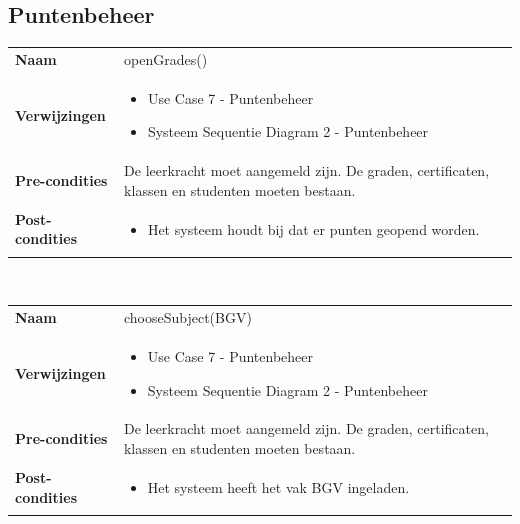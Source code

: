 \documentclass[a4paper]{article}
\begin{document}
\subsection{Puntenbeheer}
\begin{tabularx}{\textwidth}{|l X|}
    \hline
    \textbf{Naam} & openGrades() \\
    \textbf{Verwijzingen} & \begin{itemize}[leftmargin=*]
        \item Use Case 7 - Puntenbeheer
        \item Systeem Sequentie Diagram 2 - Puntenbeheer
    \end{itemize}\\
    \textbf{Pre-condities} & De leerkracht moet aangemeld zijn. De graden, certificaten, klassen en studenten moeten bestaan.\\
    \textbf{Post-condities} & \begin{itemize}[leftmargin=*]
        \item Het systeem houdt bij dat er punten geopend worden.
    \end{itemize}\\
    \hline
\end{tabularx}\\

\begin{tabularx}{\textwidth}{|l X|}
    \hline
    \textbf{Naam} & chooseSubject(BGV) \\
    \textbf{Verwijzingen} & \begin{itemize}[leftmargin=*]
        \item Use Case 7 - Puntenbeheer
        \item Systeem Sequentie Diagram 2 - Puntenbeheer
    \end{itemize}\\
    \textbf{Pre-condities} & De leerkracht moet aangemeld zijn. De graden, certificaten, klassen en studenten moeten bestaan.\\
    \textbf{Post-condities} & \begin{itemize}[leftmargin=*]
        \item Het systeem heeft het vak BGV ingeladen.
    \end{itemize}\\
    \hline
\end{tabularx}\\
\end{document}
